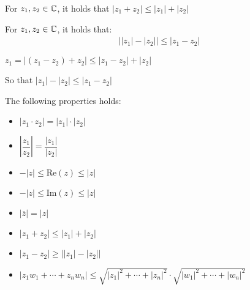 \par\bigskip
\begin{theo}{}
  For $z_1,z_2 \in\mathbb{C}$, it holds that $\left|z_1+z_2\right|\leq \left|z_1\right|+\left|z_2\right|$
\end{theo}
\par\bigskip
\begin{lem}{}
  For $z_1,z_2\in\mathbb{C}$, it holds that:
  \begin{equation*}
    \begin{gathered}
      \left|\left|z_1\right|-\left|z_2\right|\right|\leq \left|z_1-z_2\right|
    \end{gathered}
  \end{equation*}
\end{lem}
\par\bigskip
\begin{prf}[]{}
  $z_1 = \left|(z_1-z_2)+z_2\right|\leq\left|z_1-z_2\right|+\left|z_2\right|$
  \par\bigskip
  \noindent So that $\left|z_1\right|-\left|z_2\right|\leq \left|z_1-z_2\right|$
\end{prf}
\par\bigskip
\noindent The following properties holds:\par
\begin{itemize}
  \item $\left|z_1\cdot z_2\right| = \left|z_1\right|\cdot\left|z_2\right|$
  \item $\left|\dfrac{z_1}{z_2}\right| = \dfrac{\left|z_1\right|}{\left|z_2\right|}$
  \item $-\left|z\right|\leq\text{Re}(z)\leq\left|z\right|$
  \item $-\left|z\right|\leq\text{Im}(z)\leq\left|z\right|$
  \item $\left|\overline{z}\right| = \left|z\right|$
  \item $\left|z_1+z_2\right|\leq\left|z_1\right|+\left|z_2\right|$
  \item $\left|z_1-z_2\right|\geq\left|\left|z_1\right|-\left|z_2\right|\right|$
  \item $\left|z_1w_1+\cdots+z_nw_n\right|\leq\sqrt{\left|z_1\right|^2+\cdots+\left|z_n\right|^2}\cdot\sqrt{\left|w_1\right|^2+\cdots+\left|w_n\right|^2}$
\end{itemize}
\par\bigskip

